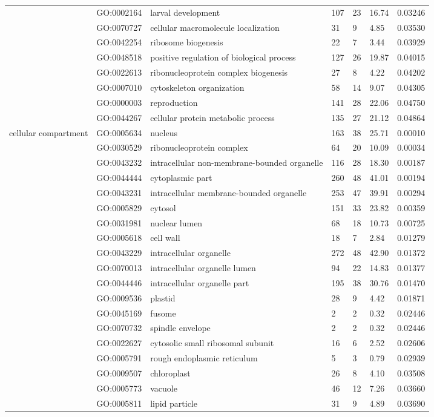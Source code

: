 \documentclass[10pt]{bmc_article}
\newenvironment{bmcformat}{\begin{raggedright}\baselineskip20pt\sloppy\setboolean{publ}{false}}{\end{raggedright}\baselineskip20pt\sloppy}
\begin{document}
\begin{bmcformat}
\begin{longtable}{p{1.7cm}lp{4.5cm}p{1cm}p{1cm}ll}
   & GO:0002164 & larval development & 107 &  23 & 16.74 & 0.03246 \\ 
   & GO:0070727 & cellular macromolecule localization &  31 &   9 & 4.85 & 0.03530 \\ 
   & GO:0042254 & ribosome biogenesis &  22 &   7 & 3.44 & 0.03929 \\ 
   & GO:0048518 & positive regulation of biological process & 127 &  26 & 19.87 & 0.04015 \\ 
   & GO:0022613 & ribonucleoprotein complex biogenesis &  27 &   8 & 4.22 & 0.04202 \\ 
   & GO:0007010 & cytoskeleton organization &  58 &  14 & 9.07 & 0.04305 \\ 
   & GO:0000003 & reproduction & 141 &  28 & 22.06 & 0.04750 \\ 
   & GO:0044267 & cellular protein metabolic process & 135 &  27 & 21.12 & 0.04864 \\ 
   \hline
cellular compartment & GO:0005634 & nucleus & 163 &  38 & 25.71 & 0.00010 \\ 
   & GO:0030529 & ribonucleoprotein complex &  64 &  20 & 10.09 & 0.00034 \\ 
   & GO:0043232 & intracellular non-membrane-bounded organelle & 116 &  28 & 18.30 & 0.00187 \\ 
   & GO:0044444 & cytoplasmic part & 260 &  48 & 41.01 & 0.00194 \\ 
   & GO:0043231 & intracellular membrane-bounded organelle & 253 &  47 & 39.91 & 0.00294 \\ 
   & GO:0005829 & cytosol & 151 &  33 & 23.82 & 0.00359 \\ 
   & GO:0031981 & nuclear lumen &  68 &  18 & 10.73 & 0.00725 \\ 
   & GO:0005618 & cell wall &  18 &   7 & 2.84 & 0.01279 \\ 
   & GO:0043229 & intracellular organelle & 272 &  48 & 42.90 & 0.01372 \\ 
   & GO:0070013 & intracellular organelle lumen &  94 &  22 & 14.83 & 0.01377 \\ 
   & GO:0044446 & intracellular organelle part & 195 &  38 & 30.76 & 0.01470 \\ 
   & GO:0009536 & plastid &  28 &   9 & 4.42 & 0.01871 \\ 
   & GO:0045169 & fusome &   2 &   2 & 0.32 & 0.02446 \\ 
   & GO:0070732 & spindle envelope &   2 &   2 & 0.32 & 0.02446 \\ 
   & GO:0022627 & cytosolic small ribosomal subunit &  16 &   6 & 2.52 & 0.02606 \\ 
   & GO:0005791 & rough endoplasmic reticulum &   5 &   3 & 0.79 & 0.02939 \\ 
   & GO:0009507 & chloroplast &  26 &   8 & 4.10 & 0.03508 \\ 
   & GO:0005773 & vacuole &  46 &  12 & 7.26 & 0.03660 \\ 
   & GO:0005811 & lipid particle &  31 &   9 & 4.89 & 0.03690 \\ 
   \hline
\hline
\end{longtable}
\newpage


\end{bmcformat}
\end{document}
